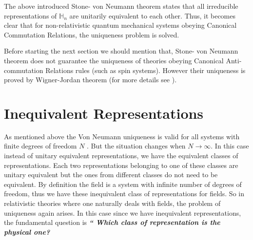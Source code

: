 \documentclass[12pt,a4paper]{article}
\begin{document}
The above introduced Stone- von Neumann theorem states that all irreducible representations of  $\mathbb{H}_n$ are unitarily equivalent to each other. Thus, it becomes clear that for non-relativistic quantum mechanical systems obeying Canonical Commutation Relations, the uniqueness problem is solved.

Before starting the next section we should mention that, Stone- von Neumann theorem does not guarantee the uniqueness of theories obeying Canonical Anti-commutation Relations rules (such as spin systems). However their uniqueness is proved by Wigner-Jordan theorem \cite{Jordan} (for more details see \cite{Laura}).

\section{Inequivalent Representations}\label{UIR}
As mentioned above the Von Neumann uniqueness is valid for all systems with finite degrees of freedom $N$ \cite{Haag}. But the situation changes when $N\rightarrow\infty$. In this case instead of unitary equivalent representations, we have the equivalent classes of representations. Each two representations belonging to one of these classes are unitary equivalent but the ones from different classes do not need to be equivalent. By definition the field is a system with infinite number of degrees of freedom, thus we have these inequivalent class of representations for fields. So in relativistic theories where one naturally deals with fields, the problem of uniqueness again arises. In this case since we have inequivalent representations, the fundamental question is \emph{\textbf{`` Which class of representation is the physical one?}}
\end{document}
